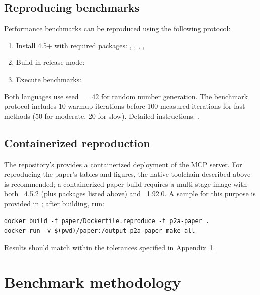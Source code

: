 \subsection{Reproducing benchmarks}

Performance benchmarks can be reproduced using the following protocol:
\begin{enumerate}
  \item Install  4.5+ with required packages: , ,
    , , 
  \item Build  in release mode: 
  \item Execute benchmarks: 
\end{enumerate}

\noindent Both languages use seed~$= 42$ for random number generation. The
benchmark protocol includes 10 warmup iterations before 100 measured iterations
for fast methods (50 for moderate, 20 for slow). Detailed
instructions: .

\subsection{Containerized reproduction}

The repository's  provides a containerized
deployment of the MCP server. For reproducing the paper's tables and
figures, the native toolchain described above is recommended; a
containerized paper build requires a multi-stage image with both
~4.5.2 (plus packages listed above) and
~1.92.0. A sample  for this purpose
is provided in ; after
building, run:

\begin{verbatim}
docker build -f paper/Dockerfile.reproduce -t p2a-paper .
docker run -v $(pwd)/paper:/output p2a-paper make all
\end{verbatim}

\noindent Results should match within the tolerances specified in
Appendix~\ref{app:benchmark-methodology}.

\section{Benchmark methodology} \label{app:benchmark-methodology}
\setcounter{table}{0}
\setcounter{figure}{0}

